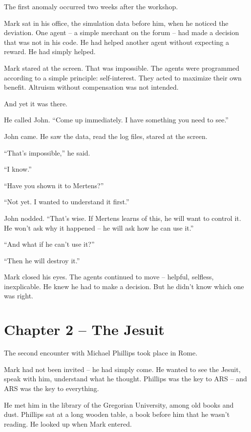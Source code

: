 \documentclass[
]{article}
\begin{document}
The first anomaly occurred two weeks after the workshop.

Mark sat in his office, the simulation data before him, when he noticed the deviation. One agent -- a simple merchant on the forum -- had made a decision that was not in his code. He had helped another agent without expecting a reward. He had simply helped.

Mark stared at the screen. That was impossible. The agents were programmed according to a simple principle: self-interest. They acted to maximize their own benefit. Altruism without compensation was not intended.

And yet it was there.

He called John. \enquote{Come up immediately. I have something you need to see.}

John came. He saw the data, read the log files, stared at the screen.

\enquote{That's impossible,} he said.

\enquote{I know.}

\enquote{Have you shown it to Mertens?}

\enquote{Not yet. I wanted to understand it first.}

John nodded. \enquote{That's wise. If Mertens learns of this, he will want to control it. He won't ask why it happened -- he will ask how he can use it.}

\enquote{And what if he can't use it?}

\enquote{Then he will destroy it.}

Mark closed his eyes. The agents continued to move -- helpful, selfless, inexplicable. He knew he had to make a decision. But he didn't know which one was right.

\newpage

\section{Chapter 2 -- The Jesuit}

The second encounter with Michael Phillips took place in Rome.

Mark had not been invited -- he had simply come. He wanted to see the Jesuit, speak with him, understand what he thought. Phillips was the key to ARS -- and ARS was the key to everything.

He met him in the library of the Gregorian University, among old books and dust. Phillips sat at a long wooden table, a book before him that he wasn't reading. He looked up when Mark entered.
\end{document}
